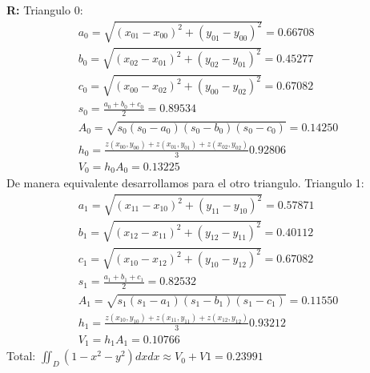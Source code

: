 \documentclass[12pt]{article}
\begin{document}
\begin{enumerate}[leftmargin=*,widest=9]
\begin{enumerate}[label=\alph*]
	  \textbf{R:}
Triangulo 0:
\begin{eqnarray*}
a_0 = \sqrt{(x_{01} - x_{00})^2 + (y_{01}-y_{00})^2} = 0.66708\\
b_0 = \sqrt{(x_{02} - x_{01})^2 + (y_{02}-y_{01})^2} = 0.45277\\
c_0 = \sqrt{(x_{00} - x_{02})^2 + (y_{00}-y_{02})^2} = 0.67082\\
s_0 = \frac{a_0+b_0+c_0}{2} = 0.89534\\
A_0 = \sqrt{s_0(s_0 - a_0)(s_0-b_0)(s_0-c_0)} = 0.14250\\
h_0 = \frac{z(x_{00},y_{00})+z(x_{01},y_{01})+z(x_{02},y_{02})}{3} 0.92806 \\
V_0 = h_0 A_0 = 0.13225
\end{eqnarray*}
De manera equivalente desarrollamos para el otro triangulo.
Triangulo 1:
\begin{eqnarray*}
a_1 = \sqrt{(x_{11} - x_{10})^2 + (y_{11}-y_{10})^2} = 0.57871\\
b_1 = \sqrt{(x_{12} - x_{11})^2 + (y_{12}-y_{11})^2} = 0.40112\\
c_1 = \sqrt{(x_{10} - x_{12})^2 + (y_{10}-y_{12})^2} = 0.67082\\
s_1 = \frac{a_1+b_1+c_1}{2} = 0.82532\\
A_1 = \sqrt{s_1(s_1 - a_1)(s_1-b_1)(s_1-c_1)} = 0.11550\\
h_1 = \frac{z(x_{10},y_{10})+z(x_{11},y_{11})+z(x_{12},y_{12})}{3} 0.93212 \\
V_1 = h_1 A_1 = 0.10766
\end{eqnarray*}
Total: \(\iint_D (1-x^2-y^2)dxdx \approx V_0 + V1 = 0.23991\)
    \end{enumerate}
\end{enumerate}
\end{document}
